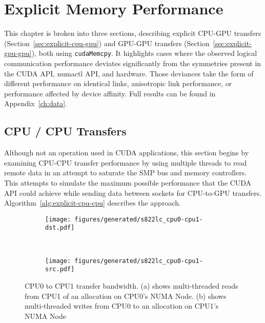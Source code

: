 \chapter{Explicit Memory Performance}
\label{ch:explicit}


This chapter is broken into three sections, describing explicit CPU-GPU transfers (Section~\ref{sec:explicit-cpu-gpu}) and GPU-GPU transfers (Section~\ref{sec:explicit-gpu-gpu}), both using \texttt{cudaMemcpy}.
It highlights cases where the observed logical communication performance deviates significantly from the symmetries present in the CUDA API, numactl API, and hardware.
Those deviances take the form of different performance on identical links, anisotropic link performance, or performance affected by device affinity.
Full results can be found in Appendix~\ref{ch:data}.

\section{CPU / CPU Transfers}
\label{sec:explicit-cpu-cpu}

Although not an operation used in CUDA applications, this section begins by examining CPU-CPU transfer performance by using multiple threads to read remote data in an attempt to saturate the SMP bus and memory controllers.
This attempts to simulate the maximum possible performance that the CUDA API could achieve while sending data between sockets for CPU-to-GPU transfers.
Algorithm~\ref{alg:explicit-cpu-cpu} describes the approach.


\begin{figure}[ht]
    \centering
    \begin{subfigure}[b]{0.3\textwidth}
        \texttt{[image: figures/generated/s822lc\_cpu0-cpu1-dst.pdf]}
        \caption{}
        \label{fig:s822lc-cpu0-cpu1}
    \end{subfigure}
    ~
    \begin{subfigure}[b]{0.3\textwidth}
        \texttt{[image: figures/generated/s822lc\_cpu0-cpu1-src.pdf]}
        \caption{}
        \label{fig:s822lc-cpu0-cpu1}
    \end{subfigure}
    \caption[]{
        CPU0 to CPU1 transfer bandwidth.
        (a) shows multi-threaded reads from CPU1 of an allocation on CPU0's NUMA Node.
        (b) shows multi-threaded writes from CPU0 to an allocation on CPU1's NUMA Node
    }
    \label{fig:cpu0-cpu1}
\end{figure}


